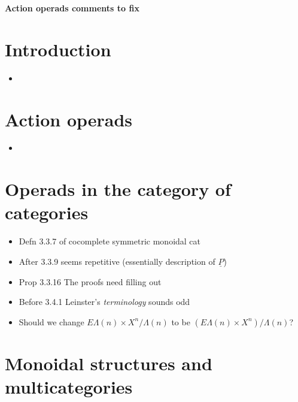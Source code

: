 \documentclass{amsart}
\begin{document}
\begin{center}
\begin{Large}
\textbf{Action operads comments to fix}
\end{Large}
\end{center}
\vskip1cm

\section{ Introduction}
\begin{itemize}
\item

\end{itemize}
\section{ Action operads}
\begin{itemize}
\item

\end{itemize}

\section{Operads in the category of categories}
\begin{itemize}
\item Defn 3.3.7 of cocomplete symmetric monoidal cat
\item After 3.3.9 seems repetitive (essentially description of $\underline{P}$)
\item Prop 3.3.16 The proofs need filling out
\item Before 3.4.1 Leinster's \textit{terminology} sounds odd
\item Should we change $E\Lambda(n) \times X^n/\Lambda(n)$ to be $\left(E\Lambda(n) \times X^n\right)/\Lambda(n)$?
\end{itemize}

\section{ Monoidal structures and multicategories}
\end{document}
